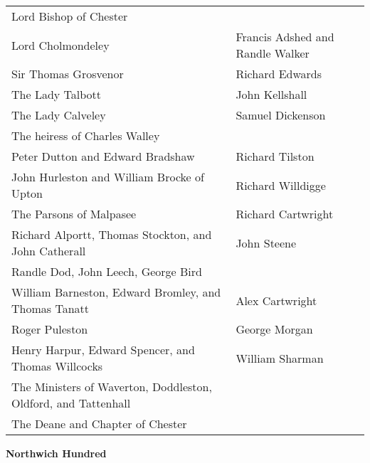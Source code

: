 \begin{center}
  \small
  \begin{tabular}{>{\raggedleft}m{5cm} m{5cm} }
    Lord Bishop of Chester & \dotfill \\
    Lord Cholmondeley & Francis Adshed and Randle Walker \\
    Sir Thomas Grosvenor & Richard Edwards \\
    The Lady Talbott & John Kellshall \\
    The Lady Calveley & Samuel Dickenson \\
    The heiress of Charles Walley & \dotfill \\
    Peter Dutton and Edward Bradshaw & Richard Tilston \\
    John Hurleston and William Brocke of Upton & Richard Willdigge \\
    The Parsons of Malpasee & Richard Cartwright \\
    Richard Alportt, Thomas Stockton, and John Catherall & John Steene \\
    Randle Dod, John Leech, George Bird & \\
    William Barneston, Edward Bromley, and Thomas Tanatt & Alex Cartwright \\
    Roger Puleston & George Morgan \\
    Henry Harpur, Edward Spencer, and Thomas Willcocks & William Sharman \\
    The Ministers of Waverton, Doddleston, Oldford, and Tattenhall & \dotfill \\
    The Deane and Chapter of Chester & \dotfill \\
  \end{tabular}
\end{center}

\pagebreak

\begin{center}
  \Large
  \textbf{Northwich Hundred}
\end{center}


